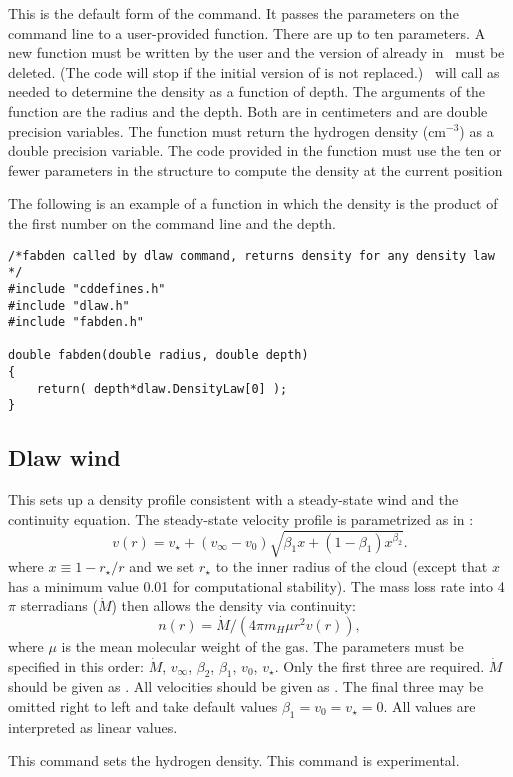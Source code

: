 This is the default form of the command.  It passes the parameters on
the command line to a user-provided function.  There are up to ten
parameters.  A new function   must be written
by the user and the
version of  already in \Cloudy\ must be deleted.
(The code will stop
if the initial version of  is not replaced.)
\Cloudy\ will call 
as needed to determine the density as a function of depth.
The arguments
of the function are the radius and the depth.
Both are in centimeters and are double precision variables.
The function must return the hydrogen density (cm$^{-3}$)
as a double precision variable.
The code provided in the function must use the ten or fewer
parameters in the structure 
to compute the density at the current position

The following is an example of a function in which the density is the
product of the first number on the command line and the depth.
\begin{verbatim}
/*fabden called by dlaw command, returns density for any density law */
#include "cddefines.h"
#include "dlaw.h"
#include "fabden.h"

double fabden(double radius, double depth)
{
    return( depth*dlaw.DensityLaw[0] );
}
\end{verbatim}

\begin{shaded}
\subsection{\experimental Dlaw wind}

This sets up a density profile consistent with a steady-state wind
and the continuity equation. The steady-state velocity profile is 
parametrized as in \citet{Springmann1994}:
\begin{equation}
v(r) = v_\star + (v_{\infty} - v_0) \sqrt{ \beta_1 x + (1-\beta_1) x^{\beta_2} }.
\end{equation}
where $x\equiv 1 - r_\star/r$ and we set $r_\star$ to the inner radius of the
cloud (except that $x$ has a minimum value 0.01 for
computational stability).
The mass loss rate into 4$\pi$ sterradians ($\dot{M}$) then allows
the density via continuity:
\begin{equation}
n(r) = \dot{M} / ( 4\pi m_H \mu r^2 v(r) ),
\end{equation}
where $\mu$ is the mean molecular weight of the gas.
The parameters must be specified in this order:
$\dot{M}$, $v_{\infty}$, $\beta_2$, $\beta_1$, $v_0$, $v_\star$.
Only the first three are required.  
$\dot{M}$ should be given as \Msunpyr.
All velocities should be given as \kmps.
The final three may be omitted right to left and
take default values $\beta_1 = v_0 = v_\star = 0$.
All values are interpreted as linear values.

This command sets the hydrogen density.  This command is experimental.
\end{shaded}

